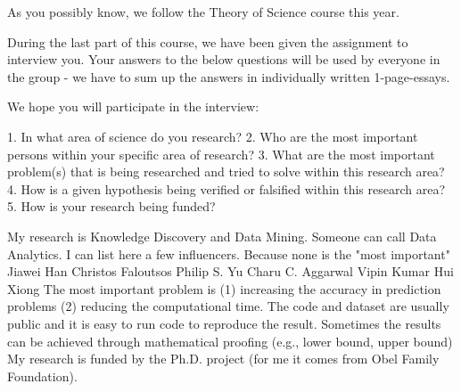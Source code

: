 As you possibly know, we follow the Theory of Science course this year. 

During the last part of this course, we have been given the assignment to interview you. Your answers to the below questions will be used by everyone in the group - we have to sum up the answers in individually written 1-page-essays. 

We hope you will participate in the interview: 

1. In what area of science do you research? 
2. Who are the most important persons within your specific area of research?
3. What are the most important problem(s) that is being researched and tried to solve within this research area?
4. How is a given hypothesis being verified or falsified within this research area? 
5. How is your research being funded? 


My research is Knowledge Discovery and Data Mining. Someone can call Data Analytics.
I can list here a few influencers. Because none is the "most important"
Jiawei Han
Christos Faloutsos
Philip S. Yu
Charu C. Aggarwal
Vipin Kumar
Hui Xiong
The most important problem is (1) increasing the accuracy in prediction problems (2) reducing the computational time. 
The code and dataset are usually public and it is easy to run code to reproduce the result. Sometimes the results can be achieved through mathematical proofing (e.g., lower bound, upper bound)
My research is funded by the Ph.D. project (for me it comes from Obel Family Foundation).
